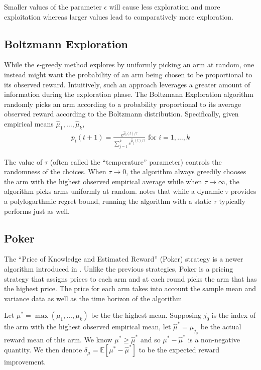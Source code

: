 \documentclass[12pt]{article}
\begin{document}
Smaller values of the parameter $\epsilon$ will cause less exploration and more exploitation whereas larger values lead to comparatively more exploration. 

\subsection{Boltzmann Exploration}
While the $\epsilon$-greedy method explores by uniformly picking an arm at random, one instead might want the probability of an arm being chosen to be proportional to its observed reward. Intuitively, such an approach leverages a greater amount of information during the exploration phase.
The Boltzmann Exploration algorithm randomly picks an arm according to a probability proportional to its average observed reward according to the Boltzmann distribution.  Specifically, given empirical means $\hat{\mu}_1, \ldots, \hat{\mu}_k$,
\begin{align*}
p_i(t+1) = \frac{e^{\hat{\mu}_i(t)/\tau}}{\sum_{j=1}^{k} e^{\hat{\mu}_j(t)/\tau}} \, \, \textrm{for } i = 1, \ldots, k
\end{align*}

The value of $\tau$ (often called the ``temperature'' parameter) controls the randomness of the choices.  When $\tau \to 0$, the algorithm always greedily chooses the arm with the highest observed empirical average while when $\tau \to \infty$, the algorithm picks
arms uniformly at random. \cite{Kuleshov} notes that while a dynamic $\tau$ provides a polylogarthmic regret bound, running the algorithm with a static $\tau$ typically performs just as well.

\subsection{Poker}
The ``Price of Knowledge and Estimated Reward'' (Poker) strategy is a newer algorithm introduced in \cite{Mohri}.  Unlike the previous strategies,
Poker is a pricing strategy that assigns prices to each arm and at each round picks the arm that has the highest price.  The price for each arm 
takes into account the sample mean and variance data as well as the time horizon of the algorithm

Let $\mu^{*} = \max(\mu_1, \ldots, \mu_k)$ be the the highest mean.  Supposing $j_{0}$ is the index of the arm with the highest observed empirical mean, 
let $\hat{\mu}^{*} = \mu_{j_{0}}$ be the actual reward mean of this arm.
We know $\mu^{*} \ge \hat{\mu}^{*}$ and so $\mu^{*} - \hat{\mu}^{*}$ is a non-negative quantity.  We then denote 
$\delta_{\mu} = \mathbb{E}[\mu^{*} - \hat{\mu}^{*}]$ to be the expected reward improvement.
\end{document}
